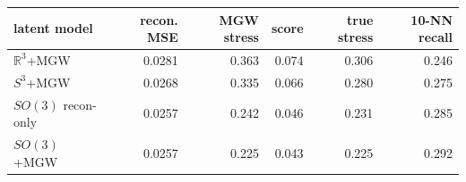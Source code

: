 \begin{tabular}{lrrrrr}
\toprule
latent model & recon. MSE & MGW stress & score & true stress & 10-NN recall \\
\midrule
$\mathbb{R}^3$+MGW & 0.0281 & 0.363 & 0.074 & 0.306 & 0.246 \\
$S^3$+MGW & 0.0268 & 0.335 & 0.066 & 0.280 & 0.275 \\
$SO(3)$ recon-only & 0.0257 & 0.242 & 0.046 & 0.231 & 0.285 \\
$SO(3)$+MGW & 0.0257 & 0.225 & 0.043 & 0.225 & 0.292 \\
\bottomrule
\end{tabular}
